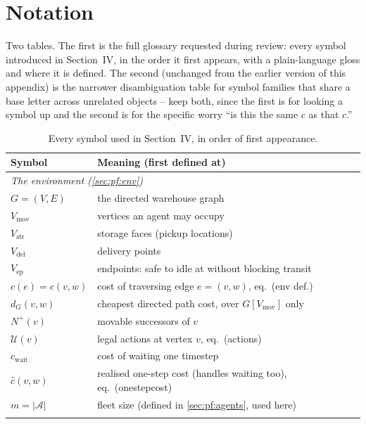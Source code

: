 \documentclass[11pt]{article}
\begin{document}
\appendix
\section{Notation}
\label{app:notation}

Two tables. The first is the full glossary requested during review: every
symbol introduced in Section~IV, in the order it first appears, with a
plain-language gloss and where it is defined. The second (unchanged from the
earlier version of this appendix) is the narrower disambiguation table for
symbol families that share a base letter across unrelated objects -- keep
both, since the first is for looking a symbol up and the second is for the
specific worry ``is this the same $c$ as that $c$.''

\begin{table}[h]
  \centering
  \caption{Every symbol used in Section~IV, in order of first appearance.}
  \label{tab:notation-full}
  \begin{tabular}{ll}
    \toprule
    Symbol & Meaning (first defined at) \\
    \midrule
    \multicolumn{2}{l}{\textit{The environment (\ref{sec:pf:env})}} \\
    $G=(V,E)$ & the directed warehouse graph \\
    $V_{\mathrm{mov}}$ & vertices an agent may occupy \\
    $V_{\mathrm{str}}$ & storage faces (pickup locations) \\
    $V_{\mathrm{del}}$ & delivery points \\
    $V_{\mathrm{ep}}$ & endpoints: safe to idle at without blocking transit \\
    $c(e)=c(v,w)$ & cost of traversing edge $e=(v,w)$, eq.~(env def.) \\
    $d_G(v,w)$ & cheapest directed path cost, over $G[V_{\mathrm{mov}}]$ only \\
    $N^{+}(v)$ & movable successors of $v$ \\
    $\mathcal{U}(v)$ & legal actions at vertex $v$, eq.~(actions) \\
    $c_{\mathrm{wait}}$ & cost of waiting one timestep \\
    $\hat c(v,w)$ & realised one-step cost (handles waiting too), eq.~(onestepcost) \\
    $m=|\mathcal{A}|$ & fleet size (defined in \ref{sec:pf:agents}, used here) \\
    \addlinespace
    \multicolumn{2}{l}{\textit{Agents and collisions (\ref{sec:pf:agents})}} \\

\end{tabular}
\end{table}
\end{document}
